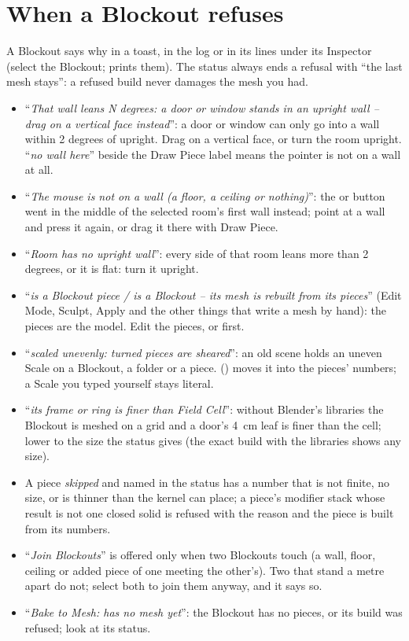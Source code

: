\section{When a Blockout refuses}
A Blockout says why in a toast, in the log or in its  lines under its Inspector (select the Blockout;  prints them). The status always ends a refusal with ``the last mesh stays'': a refused build never damages the mesh you
had.
\begin{itemize}
  \item ``\emph{That wall leans N degrees: a door or window stands in an upright wall -- drag on a vertical face instead}'':
    a door or window can only go into a wall within 2 degrees of upright. Drag on a vertical face, or turn the room upright.
    ``\emph{no wall here}'' beside the Draw Piece label means the pointer is not on a wall at all.
  \item ``\emph{The mouse is not on a wall (a floor, a ceiling or nothing)}'': the  or  button went in the
    middle of the selected room's first wall instead; point at a wall and press it again, or drag it there with Draw Piece.
  \item ``\emph{Room has no upright wall}'': every side of that room leans more than 2 degrees, or it is flat: turn it upright.
  \item ``\emph{is a Blockout piece / is a Blockout -- its mesh is rebuilt from its pieces}'' (Edit Mode, Sculpt, Apply and
    the other things that write a mesh by hand): the pieces are the model. Edit the pieces, or  first.
  \item ``\emph{scaled unevenly: turned pieces are sheared}'': an old scene holds an uneven Scale on a Blockout, a folder or a
    piece.  () moves it into the pieces' numbers; a Scale you typed
    yourself stays literal.
  \item ``\emph{its frame or ring is finer than Field Cell}'': without Blender's libraries the Blockout is meshed on a
    grid and a door's 4~cm leaf is finer than the cell; lower  to the size the status gives (the exact
    build with the libraries shows any size).
  \item A piece \emph{skipped} and named in the status has a number that is not finite, no size, or is thinner than the
    kernel can place; a piece's modifier stack whose result is not one closed solid is refused with the reason and the piece
    is built from its numbers.
  \item ``\emph{Join Blockouts}'' is offered only when two Blockouts touch (a wall, floor, ceiling or added piece of one
    meeting the other's). Two that stand a metre apart do not; select both to join them anyway, and it says so.
  \item ``\emph{Bake to Mesh: has no mesh yet}'': the Blockout has no pieces, or its build was refused; look at its status.
\end{itemize}

